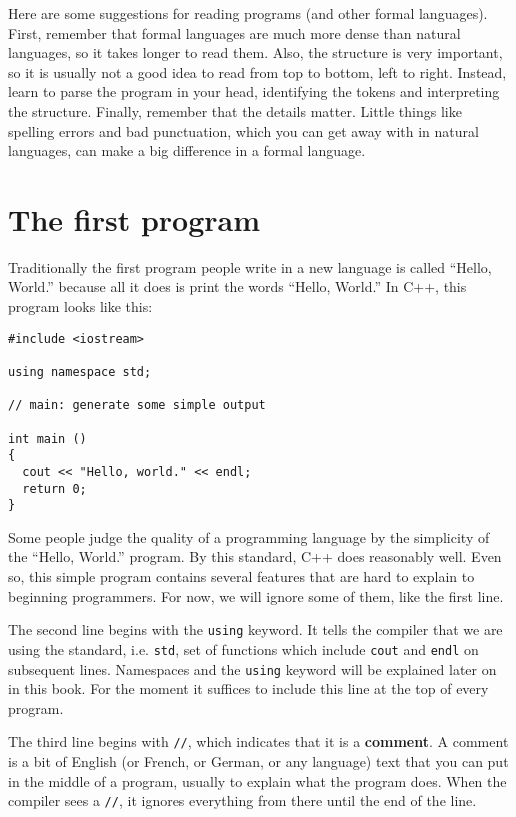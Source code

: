 Here are some suggestions for reading programs (and other formal
languages).  First, remember that formal languages are much more dense
than natural languages, so it takes longer to read them.  Also, the
structure is very important, so it is usually not a good idea to read
from top to bottom, left to right.  Instead, learn to parse the
program in your head, identifying the tokens and interpreting the
structure.  Finally, remember that the details matter.  Little things
like spelling errors and bad punctuation, which you can get away
with in natural languages, can make a big difference in a formal
language.

\section{The first program}
\label{hello}

Traditionally the first program people write in a new language
is called ``Hello, World.'' because all it does is print the
words ``Hello, World.''  In C++, this program looks like this:

\begin{verbatim}
#include <iostream>

using namespace std;

// main: generate some simple output

int main ()
{
  cout << "Hello, world." << endl;
  return 0;
}
\end{verbatim}
%
Some people judge the quality of a programming language by
the simplicity of the ``Hello, World.'' program.  By this
standard, C++ does reasonably well.  Even so, this simple
program contains several features that are hard to explain to
beginning programmers.  For now, we will ignore some of
them, like the first line.


The second line begins with the {\tt using} keyword.  It tells the compiler that we are using the standard, i.e. {\tt std}, set of functions which include {\tt cout} and {\tt endl} on subsequent lines.  Namespaces and the {\tt using} keyword will be explained later on in this book.  For the moment it suffices to include this line at the top of every program.

The third line begins with {\tt //}, which indicates
that it is a {\bf comment}.  A comment is a bit of
English (or French, or German, or any language) text that you can put in the middle of a program,
usually to explain what the program does.  When the compiler
sees a {\tt //}, it ignores everything from there until the end
of the line.

